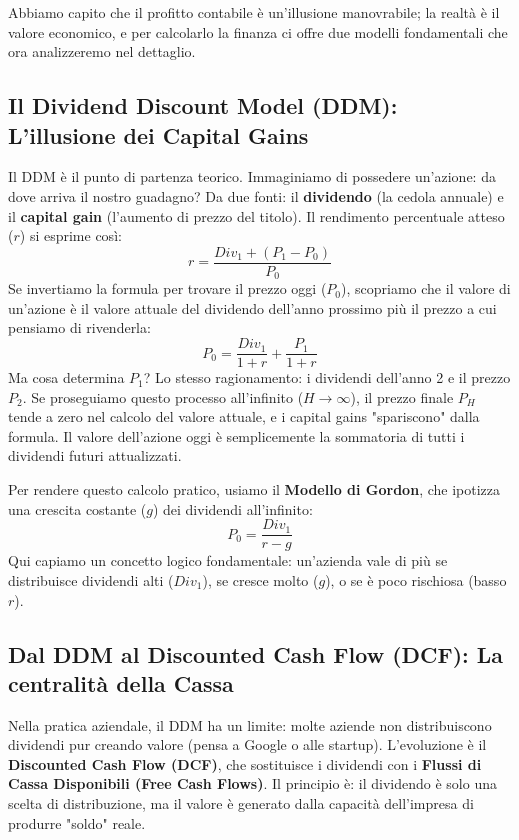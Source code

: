 \documentclass[a4paper,10pt]{article}
\begin{document}
Abbiamo capito che il profitto contabile è un'illusione manovrabile; la realtà è il valore economico, e per calcolarlo la finanza ci offre due modelli fondamentali che ora analizzeremo nel dettaglio.

\subsection*{Il Dividend Discount Model (DDM): L'illusione dei Capital Gains}

Il DDM è il punto di partenza teorico. Immaginiamo di possedere un'azione: da dove arriva il nostro guadagno? Da due fonti: il \textbf{dividendo} (la cedola annuale) e il \textbf{capital gain} (l'aumento di prezzo del titolo). 
Il rendimento percentuale atteso ($r$) si esprime così:
\[ r = \frac{Div_1 + (P_1 - P_0)}{P_0} \]
Se invertiamo la formula per trovare il prezzo oggi ($P_0$), scopriamo che il valore di un'azione è il valore attuale del dividendo dell'anno prossimo più il prezzo a cui pensiamo di rivenderla:
\[ P_0 = \frac{Div_1}{1+r} + \frac{P_1}{1+r} \]
Ma cosa determina $P_1$? Lo stesso ragionamento: i dividendi dell'anno 2 e il prezzo $P_2$. Se proseguiamo questo processo all'infinito ($H \rightarrow \infty$), il prezzo finale $P_H$ tende a zero nel calcolo del valore attuale, e i capital gains "spariscono" dalla formula. Il valore dell'azione oggi è semplicemente la sommatoria di tutti i dividendi futuri attualizzati. 

Per rendere questo calcolo pratico, usiamo il \textbf{Modello di Gordon}, che ipotizza una crescita costante ($g$) dei dividendi all'infinito:
\[ P_0 = \frac{Div_1}{r - g} \]
Qui capiamo un concetto logico fondamentale: un'azienda vale di più se distribuisce dividendi alti ($Div_1$), se cresce molto ($g$), o se è poco rischiosa (basso $r$).

\subsection*{Dal DDM al Discounted Cash Flow (DCF): La centralità della Cassa}

Nella pratica aziendale, il DDM ha un limite: molte aziende non distribuiscono dividendi pur creando valore (pensa a Google o alle startup). L'evoluzione è il \textbf{Discounted Cash Flow (DCF)}, che sostituisce i dividendi con i \textbf{Flussi di Cassa Disponibili (Free Cash Flows)}. Il principio è: il dividendo è solo una scelta di distribuzione, ma il valore è generato dalla capacità dell'impresa di produrre "soldo" reale.
\end{document}
